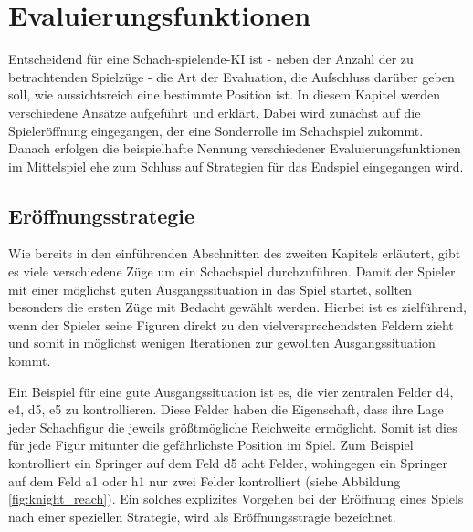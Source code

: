 \section{Evaluierungsfunktionen}\label{evaluation_func}

Entscheidend für eine Schach-spielende-KI ist - neben der Anzahl der zu betrachtenden Spielzüge - die Art der Evaluation, die Aufschluss darüber geben soll, wie aussichtsreich eine bestimmte Position ist. In diesem Kapitel werden verschiedene Ansätze aufgeführt und erklärt. Dabei wird zunächst auf die Spieleröffnung eingegangen, der eine Sonderrolle im Schachspiel zukommt. Danach erfolgen die beispielhafte Nennung verschiedener Evaluierungsfunktionen im Mittelspiel ehe zum Schluss auf Strategien für das Endspiel eingegangen wird.

\subsection{Eröffnungsstrategie}\label{opening_evaluation}
Wie bereits in den einführenden Abschnitten des zweiten Kapitels erläutert, gibt es viele verschiedene Züge um ein Schachspiel durchzuführen. Damit der Spieler mit einer möglichst guten Ausgangssituation in das Spiel startet, sollten besonders die ersten Züge mit Bedacht gewählt werden. Hierbei ist es zielführend, wenn der Spieler seine Figuren direkt zu den vielversprechendsten Feldern zieht und somit in möglichst wenigen Iterationen zur gewollten Ausgangssituation kommt.\cite{O.V.}


Ein Beispiel für eine gute Ausgangssituation ist es, die vier zentralen Felder d4, e4, d5, e5 zu kontrollieren. Diese Felder haben die Eigenschaft, dass ihre Lage jeder Schachfigur die jeweils größtmögliche Reichweite ermöglicht. Somit ist dies für jede Figur mitunter die gefährlichste Position im Spiel. Zum Beispiel kontrolliert ein Springer auf dem Feld d5 acht Felder, wohingegen ein Springer auf dem Feld a1 oder h1 nur zwei Felder kontrolliert (siehe Abbildung \ref{fig:knight_reach}). Ein solches explizites Vorgehen bei der Eröffnung eines Spiels nach einer speziellen Strategie, wird als Eröffnungsstragie bezeichnet.\cite{O.V.2017}

